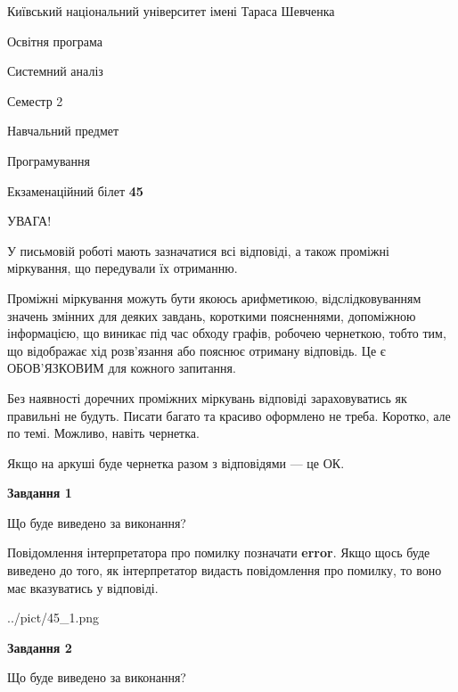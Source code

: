 \documentclass[12pt, ukrainian]{article}
\begin{document}
{{\begin {small}\par
{ \center  Київський національний університет імені Тараса Шевченка \par}
{\parbox {5 cm}{Освітня програма \hfill}{\parbox {7 cm}{Системний аналіз \hfill}}\parbox {6 cm}{\hfill Семестр 2}}\par
{\parbox {5 cm} {Навчальний предмет \hfill}\parbox {7 cm}{Програмування \hfill}\parbox {6cm}{\hfill}\par}\vspace{-7pt} \end{small}}{\center Екзаменаційний білет \No \textbf
{ 45 }\par}}
{
\begin {large}
УВАГА!

У письмовій роботі мають зазначатися всі відповіді, а також проміжні міркування, що передували їх отриманню.

Проміжні міркування можуть бути якоюсь арифметикою, відслідковуванням зна\-чень змінних для деяких завдань,
короткими поясненнями, допоміжною інформацією, що виникає під час обходу графів, робочею чернеткою,
тобто тим, що відображає хід розв’язання або пояснює отриману відповідь.
Це є ОБОВ’ЯЗКОВИМ для кожного запитання.

Без наявності доречних проміжних міркувань відповіді зараховуватись як правиль\-ні не будуть.
Писати багато та красиво оформлено не треба. Коротко, але по темі. Можли\-во, навіть чернетка.

Якщо на аркуші буде чернетка разом з відповідями --- це ОК.

\newpage

{\begin {center}\textbf{Завдання 1}\end {center}}\par
Що буде виведено за виконання?

Повідомлення інтерпретатора про помилку позначати \textbf{error}.
Якщо щось буде виведено до того, як інтерпретатор видасть повідомлення про помилку, 
то воно має вказуватись у відповіді. \par


\begin{center}
	{../pict/45_1.png}
\end{center}
\newpage

{\begin {center}\textbf{Завдання 2}\end {center}}\par
Що буде виведено за виконання?


\end{large}}
\end{document}
